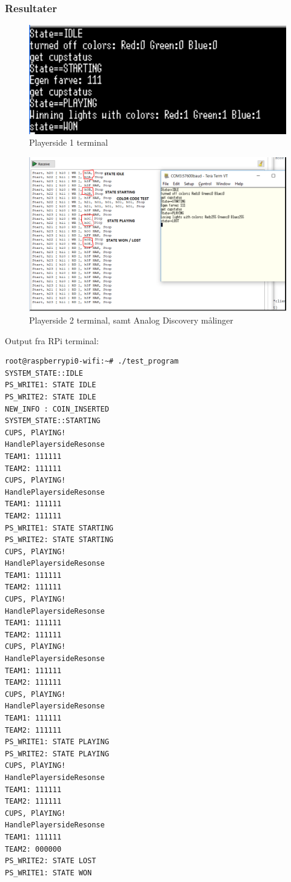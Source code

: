\documentclass[Integrationstest/Integrationstest_main.tex]{subfiles}
\begin{document}
\subsubsection{Resultater}
\begin{figure}[H]
    \centering
    \includegraphics[width=1\textwidth]{Integrationstest/PlayersideogRPi/graphicsRPivPlay/Playerside1_teraterminal.png}
    \caption{Playerside 1 terminal}
    \label{fig:test_Playerside_terminal}
\end{figure}
\begin{figure}[H]
    \centering
    \includegraphics[width=1\textwidth]{Integrationstest/PlayersideogRPi/graphicsRPivPlay/Analogogterminal.png}
    \caption{Playerside 2 terminal, samt Analog Discovery målinger}
    \label{fig:test_Playerside_analog}
\end{figure}
Output fra RPi terminal: 
\begin{verbatim}
root@raspberrypi0-wifi:~# ./test_program
SYSTEM_STATE::IDLE
PS_WRITE1: STATE IDLE
PS_WRITE2: STATE IDLE
NEW_INFO : COIN_INSERTED
SYSTEM_STATE::STARTING
CUPS, PlAYING!
HandlePlayersideResonse
TEAM1: 111111
TEAM2: 111111
CUPS, PlAYING!
HandlePlayersideResonse
TEAM1: 111111
TEAM2: 111111
PS_WRITE1: STATE STARTING
PS_WRITE2: STATE STARTING
CUPS, PlAYING!
HandlePlayersideResonse
TEAM1: 111111
TEAM2: 111111
CUPS, PlAYING!
HandlePlayersideResonse
TEAM1: 111111
TEAM2: 111111
CUPS, PlAYING!
HandlePlayersideResonse
TEAM1: 111111
TEAM2: 111111
CUPS, PlAYING!
HandlePlayersideResonse
TEAM1: 111111
TEAM2: 111111
PS_WRITE1: STATE PLAYING
PS_WRITE2: STATE PLAYING
CUPS, PlAYING!
HandlePlayersideResonse
TEAM1: 111111
TEAM2: 111111
CUPS, PlAYING!
HandlePlayersideResonse
TEAM1: 111111
TEAM2: 000000
PS_WRITE2: STATE LOST
PS_WRITE1: STATE WON
\end{verbatim}
\end{document}
